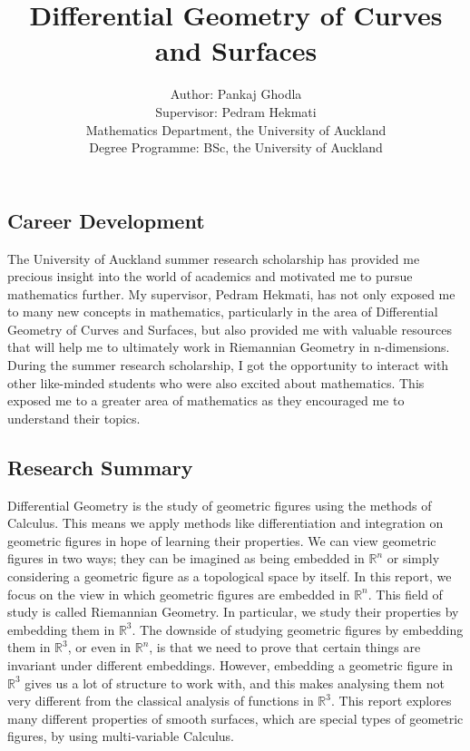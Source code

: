 \documentclass{article}
\title{ \textbf{ Differential Geometry of Curves and Surfaces}}
\author{Author: Pankaj Ghodla \\ {Supervisor: Pedram Hekmati} \\ {Mathematics Department, the University of Auckland} \\ Degree Programme: BSc, the University of Auckland}
\date{}
\theoremstyle{plain}
\theoremstyle{definition}
\theoremstyle{remark}
\newcommand{\R}{\mathbb{R}}
\begin{document}
\maketitle

\subsection*{Career Development}

The University of Auckland summer research scholarship has provided me precious insight into the world of academics and motivated me to pursue mathematics further. My supervisor, Pedram Hekmati, has not only exposed me to many new concepts in mathematics, particularly in the area of Differential Geometry of Curves and Surfaces, but also provided me with valuable resources that will help me to ultimately work in Riemannian Geometry in n-dimensions. During the summer research scholarship, I got the opportunity to interact with other like-minded students who were also excited about mathematics. This exposed me to a greater area of mathematics as they encouraged me to understand their topics.

\subsection*{Research Summary}
Differential Geometry is the study of geometric figures using the methods of Calculus. This means we apply methods like differentiation and integration on geometric figures in hope of learning their properties. We can view geometric figures in two ways; they can be imagined as being embedded in \(\R^n\) or simply considering a geometric figure as a topological space by itself. In this report, we focus on the view in which geometric figures are embedded in \( \R^n \). This field of study is called Riemannian Geometry. In particular, we study their properties by embedding them in \( \R^3 \). The downside of studying geometric figures by embedding them in \( \R^3 \), or even in \( \R^n \), is that we need to prove that certain things are invariant under different embeddings. However, embedding a geometric figure in \( \R^3 \) gives us a lot of structure to work with, and this makes analysing them not very different from the classical analysis of functions in \(\R^3\). This report explores many different properties of smooth surfaces, which are special types of geometric figures, by using multi-variable Calculus.
\end{document}
